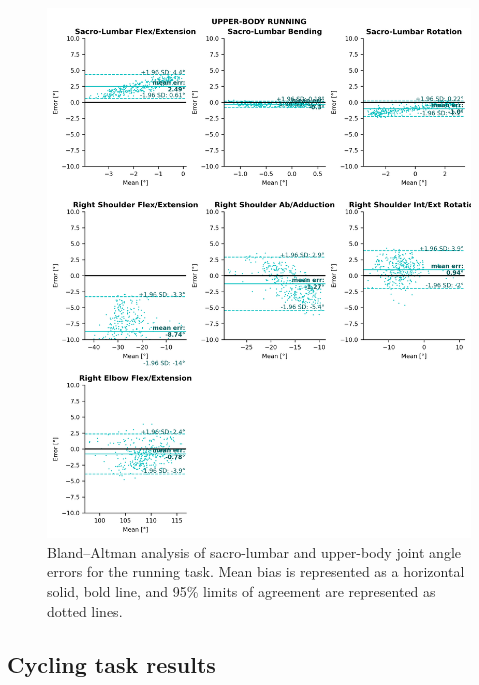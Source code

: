 \begin{figure}[!ht]
	\centering
	\def\svgwidth{1\columnwidth}
	\fontsize{10pt}{10pt}\selectfont
	\includegraphics[height=\dimexpr\textheight-119pt]{"../Annexes/Figures/Fig_BlandRunUp.png"}
	\caption{Bland–Altman analysis of sacro-lumbar and upper-body joint angle errors for the running task. Mean bias is represented as a horizontal solid, bold line, and 95\% limits of agreement are represented as dotted lines.}
	\label{fig_blandrunup}
\end{figure}


\FloatBarrier
\subsection{Cycling task results}

